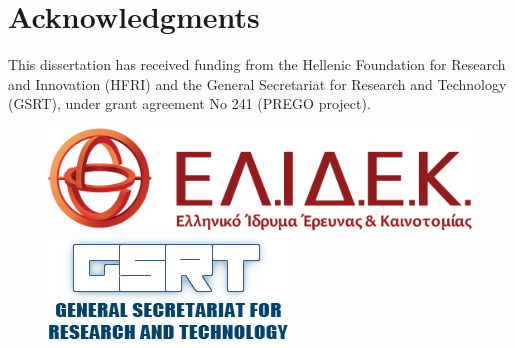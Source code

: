 % 
% 

\chapter*{Acknowledgments}
\label{acknowledge}


This dissertation has received funding from the Hellenic Foundation 
for Research and Innovation (HFRI) and the General Secretariat for Research 
and Technology (GSRT), under grant agreement No 241 (PREGO project).



\begin{figure}[!h]
   \centering
   \begin{minipage}{.5\textwidth}
     \centering
     \includegraphics[width=.75\textwidth]{figures/logo_elidek.png}
   \end{minipage}%
   \begin{minipage}{.5\textwidth}
     \centering
     \includegraphics[width=.65\textwidth]{figures/gsrt.png}
   \end{minipage}
   \label{fig:funding_logos}
\end{figure}
   


